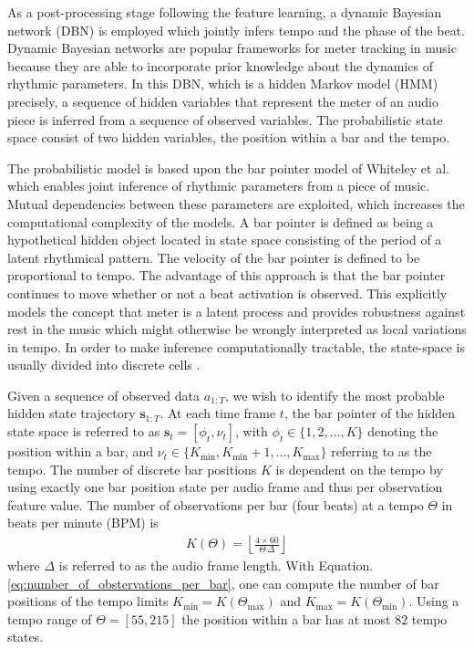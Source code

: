 \documentclass{scrartcl}
\begin{document}
As a post-processing stage following the feature learning, a dynamic Bayesian network (DBN) is employed which jointly infers tempo and the phase of the beat. Dynamic Bayesian networks are popular frameworks for meter tracking in music because they are able to incorporate prior knowledge about the dynamics of rhythmic parameters. 
In this DBN, which is a hidden Markov model (HMM) precisely, a sequence of hidden variables that represent the meter of an audio piece is inferred from a sequence of observed variables. The probabilistic state space consist of two hidden variables, the position within a bar and the tempo. 

The probabilistic model is based upon the bar pointer model of Whiteley et al. \cite{Whiteley2006} which enables joint inference of rhythmic parameters from a piece of music. Mutual dependencies between these parameters are exploited, which increases the computational complexity of the models. A bar pointer is defined as being a hypothetical hidden object located in state space consisting of the period of a latent rhythmical pattern. The velocity of the bar pointer is defined to be proportional to tempo. The advantage of this approach is that the bar pointer continues to move whether or not a beat activation is observed. This explicitly models the concept that meter is a latent process and provides robustness against rest in the music which might otherwise be wrongly interpreted as local variations in tempo. In order to make inference computationally tractable, the state-space is usually divided into discrete cells \cite{Krebs2015}. 

Given a sequence of observed data $a_{1:T}$, we wish to identify the most probable hidden state trajectory $\mathbf s_{1:T}$. At each time frame $t$, the bar pointer of the hidden state space is referred to as $\mathbf s_t = [\phi_t, \nu_t]$, with $\phi_t \in \{1, 2, \dots, K\}$ denoting the position within a bar, and $\nu_t \in \{ K_{\text{min}}, K_{\text{min}}+1, \dots, K_{\text{max}}\}$ referring to as the tempo. The number of discrete bar positions $K$ is dependent on the tempo by using exactly one bar position state per audio frame and thus per observation feature value. The number of observations per bar (four beats) at a tempo $\Theta$ in beats per minute (BPM) is
\begin{align}
K(\Theta) = \left\lfloor \frac{4 \times 60}{\Theta \, \Delta} \right\rfloor 
\label{eq:number_of_obstervations_per_bar}
\end{align} 
where $\Delta$ is referred to as the audio frame length. With Equation. \ref{eq:number_of_obstervations_per_bar}, one can compute the number of bar positions of the tempo limits $K_\text{min} = K(\Theta_\text{max})$ and $K_\text{max} =K(\Theta_\text{min})$. Using a tempo range of  $\Theta = [55, 215]$ the position within a bar has at most $82$ tempo states.
\end{document}
